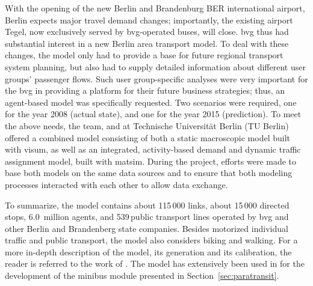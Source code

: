With the opening of the new Berlin and Brandenburg BER international airport,
Berlin expects major travel demand changes; importantly, the
existing airport Tegel, now exclusively served by \gls{bvg}-operated buses, 
will close. \gls{bvg} thus had substantial interest in a new Berlin area transport model. 
To deal with these changes, the model only had to provide
a base for future regional transport system planning, but also had to supply
detailed information about different user groups' passenger flows. 
Such user group-specific analyses were very important for
the \gls{bvg} in providing a platform for their future business strategies; thus,
an agent-based model was specifically requested. Two scenarios were
required, one for the year 2008 (actual state), and one for the year
2015 (prediction). To meet the above needs, the
\citet{PTV2013} team, \citet{Senozon2013} and \citet{VSP2013} at Technische Universität Berlin (TU Berlin)
offered a combined model consisting of both a static macroscopic model built with
\gls{visum}, as well as an integrated, activity-based demand and
dynamic traffic assignment model, built with \gls{matsim}. During
the project, efforts were made to base both models on the same data
sources and to ensure that both modeling processes interacted with each other to allow data
exchange.

To summarize, the model contains about 115\,000 links, %
about 15\,000 directed stops, %
6.0~million agents, %
and 539\,public transport lines operated by \gls{bvg} and other Berlin and Brandenberg state companies. 
Besides motorized individual traffic and public transport, the model also considers biking and walking. 
For a more in-depth description of the model, its generation and its calibration, the reader is referred to the work of
\cite{NeumannEtAl2014IatbrPtBerlinBook}. The model has extensively been used in \citet[][Ch 7/8]{Neumann2014PhD} for the development of the minibus module presented in Section~\ref{sec:paratransit}.

